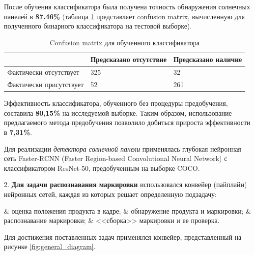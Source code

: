 \documentclass{thesisby}
\begin{document}
После обучения классификатора была получена точность обнаружения солнечных панелей в \textbf{87.46\%} (таблица \ref{table:solar_detection_cm} представляет confusion matrix, вычисленную для полученного бинарного классификатора на тестовой выборке).

\begin{table}[H]
	\caption{Confusion matrix для обученного классификатора}
	\label{table:solar_detection_cm}
	\centering
	\begin{tabular}{|p{6cm}|p{4cm}|p{4cm}|}
		\hline
		& \textbf{Предсказано отсутствие} & \textbf{Предсказано наличие}\\
		\hline
	    Фактически отсутствует & 325  & 32 \\
	    \hline
		Фактически присутствует & 52 & 261 \\
		\hline
	\end{tabular}			
\end{table}	

Эффективность классификатора, обученного без процедуры предобучения, составила \textbf{80,15\%}  на исследуемой выборке. 
Таким образом, использование предлагаемого метода предобучения позволило добиться прироста эффективности в \textbf{7,31\%}.

Для реализации \textit{детектора солнечной панели} применялась глубокая нейронная сеть Faster-RCNN (Faster Region-based Convolutional Neural Network) с классификатором ResNet-50, предобученным на выборке COCO.

2. \textbf{Для задачи распознавания маркировки} использовался конвейер (пайплайн) нейронных сетей, каждая из которых решает определенную подзадачу:
\begin{easylistNum}
  & оценка положения продукта в кадре;
	& обнаружение продукта и маркировки;
	& распознавание маркировки;
	& <<сборка>> маркировки и ее проверка.
\end{easylistNum}

Для достижения поставленных задач применялся конвейер, представленный на рисунке \ref{fig:general_diagram}.
 
\end{document}
